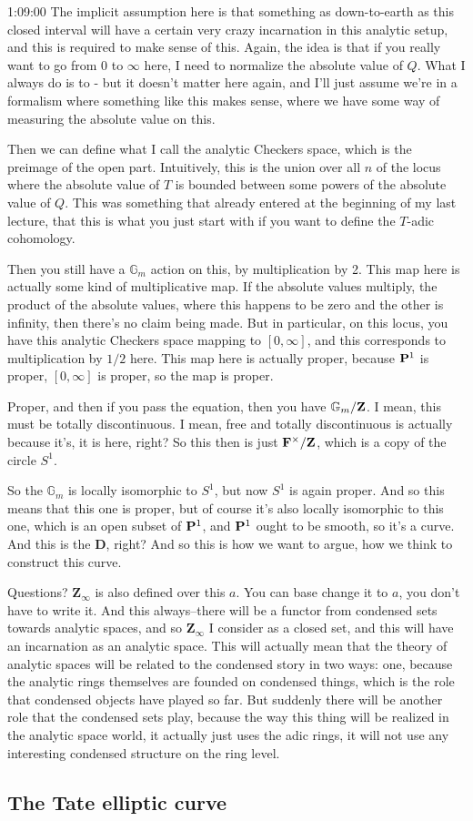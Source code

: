 \begin{unfinished}{1:09:00}
The implicit assumption here is that something as down-to-earth as this closed interval will have a certain very crazy incarnation in this analytic setup, and this is required to make sense of this. Again, the idea is that if you really want to go from 0 to $\infty$ here, I need to normalize the absolute value of $Q$. What I always do is to - but it doesn't matter here again, and I'll just assume we're in a formalism where something like this makes sense, where we have some way of measuring the absolute value on this.

Then we can define what I call the analytic Checkers space, which is the preimage of the open part. Intuitively, this is the union over all $n$ of the locus where the absolute value of $T$ is bounded between some powers of the absolute value of $Q$. This was something that already entered at the beginning of my last lecture, that this is what you just start with if you want to define the $T$-adic cohomology.

Then you still have a $\mathbb{G}_m$ action on this, by multiplication by 2. This map here is actually some kind of multiplicative map. If the absolute values multiply, the product of the absolute values, where this happens to be zero and the other is infinity, then there's no claim being made. But in particular, on this locus, you have this analytic Checkers space mapping to $[0,\infty]$, and this corresponds to multiplication by $1/2$ here. This map here is actually proper, because $\P^1$ is proper, $[0,\infty]$ is proper, so the map is proper.

Proper, and then if you pass the equation, then you have $\mathbb{G}_m / \Z$. I mean, this must be totally discontinuous. I mean, free and totally discontinuous is actually because it's, it is here, right? So this then is just $\F^\times / \Z$, which is a copy of the circle $S^1$. 

So the $\mathbb{G}_m$ is locally isomorphic to $S^1$, but now $S^1$ is again proper. And so this means that this one is proper, but of course it's also locally isomorphic to this one, which is an open subset of $\P^1$, and $\P^1$ ought to be smooth, so it's a curve. And this is the $\mathbf{D}$, right? And so this is how we want to argue, how we think to construct this curve.

Questions? $\mathbf{Z}_\infty$ is also defined over this $a$. You can base change it to $a$, you don't have to write it. And this always--there will be a functor from condensed sets towards analytic spaces, and so $\mathbf{Z}_\infty$ I consider as a closed set, and this will have an incarnation as an analytic space. This will actually mean that the theory of analytic spaces will be related to the condensed story in two ways: one, because the analytic rings themselves are founded on condensed things, which is the role that condensed objects have played so far. But suddenly there will be another role that the condensed sets play, because the way this thing will be realized in the analytic space world, it actually just uses the adic rings, it will not use any interesting condensed structure on the ring level.

\end{unfinished}
\subsection{\ufs The Tate elliptic curve}